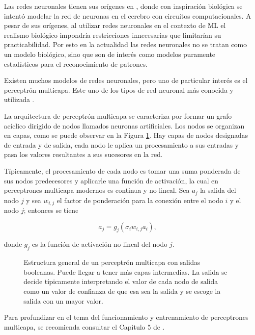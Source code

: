 Las redes neuronales tienen sus orígenes en \cite{mcculloch_logical_1943},
donde con inspiración biológica se intentó modelar la red de neuronas en el
cerebro con circuitos computacionales. A pesar de sus orígenes, al utilizar
redes neuronales en el contexto de ML el realismo biológico impondría
restricciones innecesarias que limitarían su practicabilidad. Por esto en la
actualidad las redes neuronales no se tratan como un modelo biológico, sino
que son de interés como modelos puramente estadísticos para el reconocimiento
de patrones.

Existen muchos modelos de redes neuronales, pero uno de particular interés es
el perceptrón multicapa. Este uno de los tipos de red neuronal más conocida y
utilizada \cite{popescu_multilayer_2009}.

La arquitectura de perceptrón multicapa se caracteriza por formar un grafo
acíclico dirigido de nodos llamados neuronas artificiales. Los nodos se
organizan en capas, como se puede observar en la Figura \ref{fig:MLP}. Hay
capas de nodos designadas de entrada y de salida, cada nodo le aplica un
procesamiento a sus entradas y pasa los valores resultantes a sus sucesores en
la red.

Típicamente, el procesamiento de cada nodo es tomar una suma ponderada de sus
nodos predecesores y aplicarle una función de activación, la cual en
perceptrones multicapa modernos es continua y no lineal. Sea $a_j$ la salida
del nodo $j$ y sea $w_{i,j}$ el factor de ponderación para la conexión entre el
nodo $i$ y el nodo $j$; entonces se tiene

$$a_j = g_j\left(\sigma_i w_{i,j} a_i \right),$$

donde $g_j$ es la función de activación no lineal del nodo $j$.
\cite{russell2016artificial}

\begin{figure}[htb]
  \centering
  
  \caption{Estructura general de un perceptrón multicapa con salidas booleanas.
    Puede llegar a tener más capas intermedias. La salida se decide típicamente
    interpretando el valor de cada nodo de salida como un valor de confianza de
  que esa sea la salida y se escoge la salida con un mayor valor.}
  \label{fig:MLP}
\end{figure}

Para profundizar en el tema del funcionamiento y entrenamiento de perceptrones
multicapa, se recomienda consultar el Capítulo 5 de \cite{bishop_pattern_2006}.

